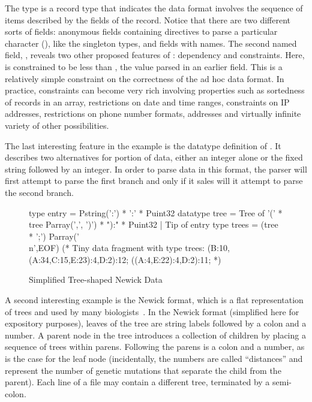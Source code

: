 \documentclass{entcs}
\begin{document}
The type  is a record type that indicates
the data format involves the sequence of items described by
the fields of the record.  Notice that there are two different
sorts of fields: anonymous fields containing directives to parse
a particular character (), like the singleton types,
and fields with names.  The second named field,
, reveals two other proposed features of 
\datatype: dependency and constraints.  Here,
 is constrained to be less than
, the value parsed in an earlier field.
This is a relatively simple constraint on the correctness of the
ad hoc data format.  In practice, constraints can become very rich
involving properties such as sortedness of records in an array,
restrictions on date and time ranges, constraints on IP addresses,
restrictions on phone number formats, addresses and virtually 
infinite variety of other possibilities. 

The last interesting feature in the \dibbler{} example is the
datatype definition of .  It describes
two alternatives for portion of data, either an integer alone
or the fixed string  followed by an integer.
In order to parse data in this format, the parser will
first attempt to parse the first branch and only if it
sales will it attempt to parse the second branch.

\begin{figure}
\begin{code}
type entry = Pstring(':') * ':' * Puint32
\mbox{}
datatype tree =
    Tree of '(' * tree Parray(',', ')') * "):" * Puint32
  | Tip of entry
\mbox{}
type trees = (tree * ';') Parray('\\n',EOF)
\mbox{}
(* Tiny data fragment with type trees:
\mbox{}
(B:10,(A:34,C:15,E:23):4,D:2):12;
((A:4,E:22):4,D:2):11;
\mbox{}
*)
\end{code}
\caption{Simplified Tree-shaped Newick Data}
\label{fig:newick}
\end{figure}

A second interesting example is the Newick format, which is a flat
representation of trees and used by many biologists~\cite{newick}.  In
the Newick format (simplified here for expository purposes), leaves of
the tree are string labels followed by a colon and a number.  A parent
node in the tree introduces a collection of children by placing a
sequence of trees within parens.  Following the parens is a colon and
a number, as is the case for the leaf node (incidentally, the numbers
are called ``distances'' and represent the number of genetic mutations
that separate the child from the parent).  Each line of a file may
contain a different tree, terminated by a semi-colon.
\end{document}
